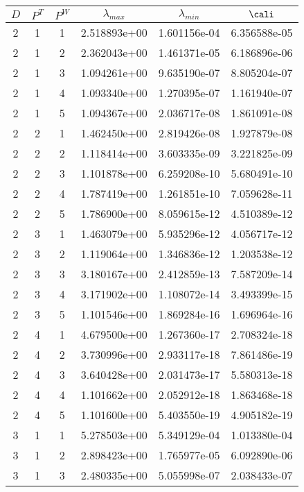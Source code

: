 \documentclass{article}
\begin{document}
{\begin{small}
\begin{table}
\begin{center}
  \begin{tabular}{|ccc|ccc|} \hline
 $D$ & $P^T$  & $P^W$  & $\lambda_{max}$ & $\lambda_{min}$   & $\cali$ \\
  \hline
2 & 1 & 1  & 2.518893e+00 & 1.601156e-04 & 6.356588e-05 \\ 
2 & 1 & 2  & 2.362043e+00 & 1.461371e-05 & 6.186896e-06 \\ 
2 & 1 & 3  & 1.094261e+00 & 9.635190e-07 & 8.805204e-07 \\ 
2 & 1 & 4  & 1.093340e+00 & 1.270395e-07 & 1.161940e-07 \\ 
2 & 1 & 5  & 1.094367e+00 & 2.036717e-08 & 1.861091e-08 \\ 
2 & 2 & 1  & 1.462450e+00 & 2.819426e-08 & 1.927879e-08 \\ 
2 & 2 & 2  & 1.118414e+00 & 3.603335e-09 & 3.221825e-09 \\ 
2 & 2 & 3  & 1.101878e+00 & 6.259208e-10 & 5.680491e-10 \\ 
2 & 2 & 4  & 1.787419e+00 & 1.261851e-10 & 7.059628e-11 \\ 
2 & 2 & 5  & 1.786900e+00 & 8.059615e-12 & 4.510389e-12 \\ 
2 & 3 & 1  & 1.463079e+00 & 5.935296e-12 & 4.056717e-12 \\ 
2 & 3 & 2  & 1.119064e+00 & 1.346836e-12 & 1.203538e-12 \\ 
2 & 3 & 3  & 3.180167e+00 & 2.412859e-13 & 7.587209e-14 \\ 
2 & 3 & 4  & 3.171902e+00 & 1.108072e-14 & 3.493399e-15 \\ 
2 & 3 & 5  & 1.101546e+00 & 1.869284e-16 & 1.696964e-16 \\ 
2 & 4 & 1  & 4.679500e+00 & 1.267360e-17 & 2.708324e-18 \\ 
2 & 4 & 2  & 3.730996e+00 & 2.933117e-18 & 7.861486e-19 \\ 
2 & 4 & 3  & 3.640428e+00 & 2.031473e-17 & 5.580313e-18 \\ 
2 & 4 & 4  & 1.101662e+00 & 2.052912e-18 & 1.863468e-18 \\ 
2 & 4 & 5  & 1.101600e+00 & 5.403550e-19 & 4.905182e-19 \\
\hline
3 & 1 & 1  & 5.278503e+00 & 5.349129e-04 & 1.013380e-04 \\ 
3 & 1 & 2  & 2.898423e+00 & 1.765977e-05 & 6.092890e-06 \\ 
3 & 1 & 3  & 2.480335e+00 & 5.055998e-07 & 2.038433e-07 \\ 

\end{tabular}
\end{center}
\end{table}
\end{small}}
\end{document}
